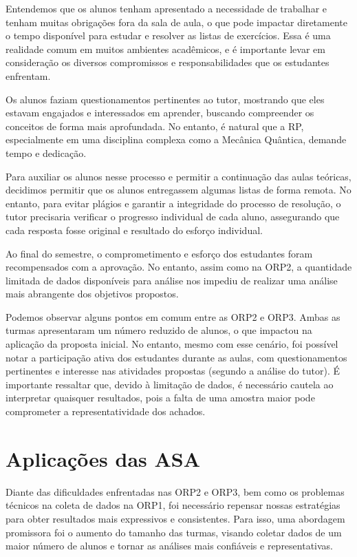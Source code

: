 Entendemos que os alunos tenham apresentado a necessidade de trabalhar e tenham muitas obrigações fora da sala de aula, o que pode impactar diretamente o tempo disponível para estudar e resolver as listas de exercícios. Essa é uma realidade comum em muitos ambientes acadêmicos, e é importante levar em consideração os diversos compromissos e responsabilidades que os estudantes enfrentam.

Os alunos faziam questionamentos pertinentes ao tutor, mostrando que eles estavam engajados e interessados em aprender, buscando compreender os conceitos de forma mais aprofundada. No entanto, é natural que a RP, especialmente em uma disciplina complexa como a Mecânica Quântica, demande tempo e dedicação.

Para auxiliar os alunos nesse processo e permitir a continuação das aulas teóricas, decidimos permitir que os alunos entregassem algumas listas de forma remota. No entanto, para evitar plágios e garantir a integridade do processo de resolução, o tutor precisaria verificar o progresso individual de cada aluno, assegurando que cada resposta fosse original e resultado do esforço individual. 

Ao final do semestre, o comprometimento e esforço dos estudantes foram recompensados com a aprovação. No entanto, assim como na ORP2, a quantidade limitada de dados disponíveis para análise nos impediu de realizar uma análise mais abrangente dos objetivos propostos. 

Podemos observar alguns pontos em comum entre as ORP2 e ORP3. Ambas as turmas apresentaram um número reduzido de alunos, o que impactou na aplicação da proposta inicial. No entanto, mesmo com esse cenário, foi possível notar a participação ativa dos estudantes durante as aulas, com questionamentos pertinentes e interesse nas atividades propostas (segundo a análise do tutor). É importante ressaltar que, devido à limitação de dados, é necessário cautela ao interpretar quaisquer resultados, pois a falta de uma amostra maior pode comprometer a representatividade dos achados. 

\section{Aplicações das ASA}


Diante das dificuldades enfrentadas nas ORP2 e ORP3, bem como os problemas técnicos na coleta de dados na ORP1, foi necessário repensar nossas estratégias para obter resultados mais expressivos e consistentes. Para isso, uma abordagem promissora foi o aumento do tamanho das turmas, visando coletar dados de um maior número de alunos e tornar as análises mais confiáveis e representativas.

